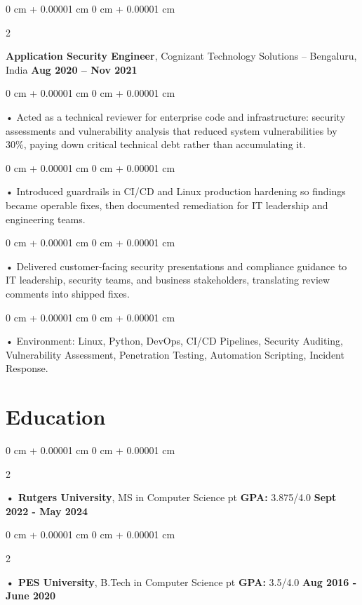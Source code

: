 \documentclass[10pt, letterpaper]{article}
\newenvironment{onecolentry}{
    \begin{adjustwidth}{
        0 cm + 0.00001 cm
    }{
        0 cm + 0.00001 cm
    }
}{
    \end{adjustwidth}
} %
\newenvironment{twocolentry}[2][]{
    \onecolentry
    \def\secondColumn{#2}
    \setcolumnwidth{\fill, 4.5 cm}
    \begin{paracol}{2}
}{
    \switchcolumn \raggedleft \secondColumn
    \end{paracol}
    \endonecolentry
} %
\begin{document}
        \begin{twocolentry}{
            \textbf{Aug 2020 – Nov 2021}
        }
            \vspace{2 pt }
            \textbf{Application Security Engineer}, Cognizant Technology Solutions -- Bengaluru, India\end{twocolentry}
        \begin{onecolentry}
             • Acted as a technical reviewer for enterprise code and infrastructure: security assessments and vulnerability analysis that reduced system vulnerabilities by 30\%, paying down critical technical debt rather than accumulating it.
        \end{onecolentry}
        \begin{onecolentry}
             • Introduced guardrails in CI/CD and Linux production hardening so findings became operable fixes, then documented remediation for IT leadership and engineering teams.
        \end{onecolentry}
        \begin{onecolentry}
             • Delivered customer-facing security presentations and compliance guidance to IT leadership, security teams, and business stakeholders, translating review comments into shipped fixes.
        \end{onecolentry}
        \begin{onecolentry}
             • Environment: Linux, Python, DevOps, CI/CD Pipelines, Security Auditing, Vulnerability Assessment, Penetration Testing, Automation Scripting, Incident Response.
        \end{onecolentry}
    \vspace{2 pt }
        \section{Education}
        \vspace{2 pt }
        \begin{twocolentry}{
            \textbf{Sept 2022 - May 2024}
        }
            \textbf{ • Rutgers University}, MS in Computer Science  pt \textbf{GPA:} 3.875/4.0  \end{twocolentry}

        \begin{twocolentry}{
            \textbf{Aug 2016 - June 2020}
        }
            \textbf{ • PES University}, B.Tech in Computer Science  pt \textbf{GPA:} 3.5/4.0  \end{twocolentry}
\end{document}
